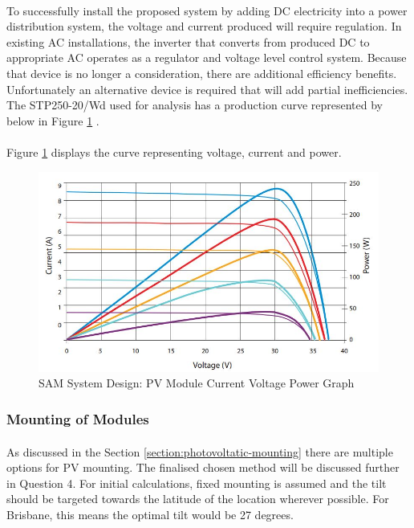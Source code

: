 \paragraph{}
To successfully install the proposed system by adding DC electricity into a power distribution system, the voltage and current produced will require regulation. In existing AC installations, the inverter that converts from produced DC to appropriate AC operates as a regulator and voltage level control system. Because that device is no longer a consideration, there are additional efficiency benefits. Unfortunately an alternative device is required that will add partial inefficiencies. The STP250-20/Wd used for analysis has a production curve represented by below in Figure \ref{fig:PV-Module-Spec-Graph} \cite{website:SuntechModule}.

\paragraph{}
Figure \ref{fig:PV-Module-Spec-Graph} displays the curve representing voltage, current and power.

\begin{figure}[H]
	\hfill\includegraphics[width = 120mm]{images/sam/pv-module-current-voltage-graph}\hspace*{\fill}
	\caption{SAM System Design: PV Module Current Voltage Power Graph \cite{website:SuntechModule}} 
	\label{fig:PV-Module-Spec-Graph}
\end{figure}


\subsubsection{Mounting of Modules}

\paragraph{}
As discussed in the Section \ref{section:photovoltatic-mounting} there are multiple options for PV mounting. The finalised chosen method will be discussed further in Question 4. For initial calculations, fixed mounting is assumed and the tilt should be targeted towards the latitude of the location wherever possible. For Brisbane, this means the optimal tilt would be 27 degrees.   


